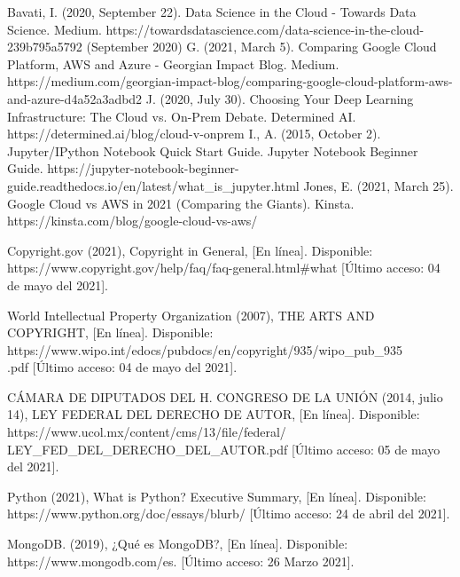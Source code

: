 \documentclass[12pt, a4paper, titlepage]{report}
\begin{document}
\begin{thebibliography}{20}
	Bavati, I. (2020, September 22). Data Science in the Cloud - Towards Data Science. Medium. https://towardsdatascience.com/data-science-in-the-cloud-239b795a5792 (September 2020)
	G. (2021, March 5). Comparing Google Cloud Platform, AWS and Azure - Georgian Impact Blog. Medium. https://medium.com/georgian-impact-blog/comparing-google-cloud-platform-aws-and-azure-d4a52a3adbd2
	J. (2020, July 30). Choosing Your Deep Learning Infrastructure: The Cloud vs. On-Prem Debate. Determined AI. https://determined.ai/blog/cloud-v-onprem
	I., A. (2015, October 2). Jupyter/IPython Notebook Quick Start Guide. Jupyter Notebook Beginner Guide. https://jupyter-notebook-beginner-guide.readthedocs.io/en/latest/what\_is\_jupyter.html
	Jones, E. (2021, March 25). Google Cloud vs AWS in 2021 (Comparing the Giants). Kinsta. https://kinsta.com/blog/google-cloud-vs-aws/
	
	Copyright.gov (2021), Copyright in General, [En línea]. Disponible: https://www.copyright.gov/help/faq/faq-general.html\#what [Último acceso: 04 de mayo del 2021].
	
	World Intellectual Property Organization (2007), THE ARTS AND COPYRIGHT, [En línea]. Disponible: https://www.wipo.int/edocs/pubdocs/en/copyright/935/wipo\_pub\_935\\.pdf [Último acceso: 04 de mayo del 2021].
	
	CÁMARA DE DIPUTADOS DEL H. CONGRESO DE LA UNIÓN (2014, julio 14), LEY FEDERAL DEL DERECHO DE AUTOR, [En línea]. Disponible: https://www.ucol.mx/content/cms/13/file/federal/\\LEY\_FED\_DEL\_DERECHO\_DEL\_AUTOR.pdf [Último acceso: 05 de mayo del 2021].
	
	Python (2021), What is Python? Executive Summary, [En línea]. Disponible: https://www.python.org/doc/essays/blurb/ [Último acceso: 24 de abril del 2021].
	
	
	
	MongoDB. (2019), ¿Qué es MongoDB?, [En línea]. Disponible: https://www.mongodb.com/es. [Último acceso: 26 Marzo 2021].
	

\end{thebibliography}
\end{document}

